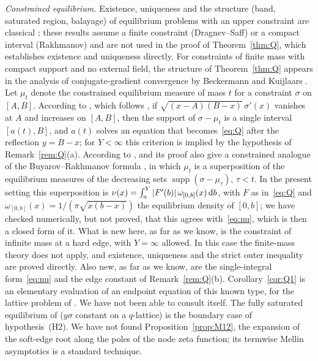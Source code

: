 \emph{Constrained equilibrium.} Existence, uniqueness and the structure (band, saturated region, balayage) of equilibrium
problems with an upper constraint are classical \cite{Rakhmanov,DragnevSaff}; these results assume a finite constraint
(Dragnev--Saff) or a compact interval (Rakhmanov) and are not used in the proof of Theorem~\ref{thm:Q}, which establishes
existence and uniqueness directly. For constraints of finite mass with compact support and no external field, the structure of
Theorem~\ref{thm:Q} appears in the analysis of conjugate-gradient convergence by Beckermann and Kuijlaars
\cite{BeckermannKuijlaars2001}. Let $\mu_t$ denote the constrained equilibrium measure of mass $t$ for a constraint $\sigma$ on $[A,B]$.
According to \cite[Lemma~1.5]{BeckermannHelart}, which follows \cite[Lemma~3.1(a)]{BeckermannKuijlaars2001}, if
$\sqrt{(x-A)(B-x)}\,\sigma'(x)$ vanishes at $A$ and increases on $[A,B]$, then the support of $\sigma-\mu_t$ is a single interval
$[a(t),B]$, and $a(t)$ solves an equation that becomes~\eqref{eq:Q} after the reflection $y=B-x$; for $Y<\infty$ this criterion is
implied by the hypothesis of Remark~\ref{rem:Q}(a). According to \cite{BeckermannGuettel,BeckermannKuijlaars2002},
\cite[Theorem~2.1]{BeckermannKuijlaars2001} and its proof also give a constrained analogue of the Buyarov--Rakhmanov formula
\cite{BuyarovRakhmanov}, in which $\mu_t$ is a superposition of the equilibrium measures of the decreasing sets
$\operatorname{supp}(\sigma-\mu_\tau)$, $\tau<t$. In the present setting this superposition is
$\nu(x)=\int_a^Y|F'(b)|\,\omega_{[0,b]}(x)\,\mathrm{d} b$, with $F$ as in~\eqref{eq:Q} and $\omega_{[0,b]}(x)=1/(\pi\sqrt{x(b-x)})$ the
equilibrium density of $[0,b]$; we have checked numerically, but not proved, that this agrees with~\eqref{eq:nu}, which is then a closed
form of it. What is new here, as far as we know, is the constraint of infinite mass at a hard edge, with $Y=\infty$ allowed. In this
case the finite-mass theory \cite{Rakhmanov,DragnevSaff} does not apply, and existence, uniqueness and the strict outer inequality are
proved directly. Also new, as far as we know, are the single-integral form~\eqref{eq:nu} and the edge constant of
Remark~\ref{rem:Q}(b). Corollary~\ref{cor:Q1} is an elementary evaluation of an endpoint equation of this known type, for the lattice
problem of \cite[Theorem~1.3]{PaperI}. We have not been able to consult \cite{BeckermannKuijlaars2001} itself. The fully saturated
equilibrium of \cite{VanAsscheVanBaelen} ($y\sigma$ constant on a $q$-lattice) is the boundary case of hypothesis~(H2). We have not found
Proposition~\ref{prop:M12}, the expansion of the soft-edge root along the poles of the node zeta function; its termwise Mellin
asymptotics is a standard technique.

